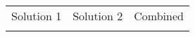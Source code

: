 \begin{center}
\begin{tabular}{ccc}
Solution 1 & Solution 2 & Combined \\
\begin{tikzpicture}

\end{tikzpicture}
&
\begin{tikzpicture}

\end{tikzpicture}
&
\begin{tikzpicture}

\end{tikzpicture}
\end{tabular}
\end{center}
